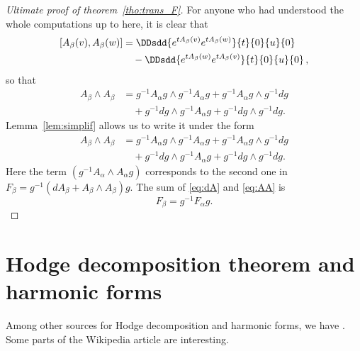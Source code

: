 \begin{proof}[Ultimate proof of theorem~\ref{tho:trans_F}]
	For anyone who had understood the whole computations up to here, it is clear that
	\begin{equation}
		\begin{split}
			[A_{\beta}(v),A_{\beta}(w)]&=\DDsdd{ e^{tA_{\beta}(v)}e^{tA_{\beta}(w)} }{t}{0}{u}{0}\\
			&\quad-\DDsdd{ e^{tA_{\beta}(w)}e^{tA_{\beta}(v)} }{t}{0}{u}{0}\,,
		\end{split}
	\end{equation}
	so that
	\begin{equation}
		\begin{split}
			A_{\beta}\wedge A_{\beta}&=g^{-1} A_{\alpha} g\wedge g^{-1} A_{\alpha} g
			+g^{-1} A_{\alpha} g\wedge g^{-1} dg\\
			&\quad+g^{-1} dg\wedge g^{-1} A_{\alpha} g
			+g^{-1} dg\wedge g^{-1} dg.
		\end{split}
	\end{equation}
	Lemma~\ref{lem:simplif} allows us to write it under the form
	\begin{equation}\label{eq:AA}
		\begin{split}
			A_{\beta}\wedge A_{\beta}&=g^{-1} A_{\alpha} g\wedge g^{-1} A_{\alpha} g
			+g^{-1} A_{\alpha} g\wedge g^{-1} dg\\
			&\quad+g^{-1} dg\wedge g^{-1} A_{\alpha} g
			+g^{-1} dg\wedge g^{-1} dg.
		\end{split}
	\end{equation}
	Here the term $(g^{-1} A_{\alpha}\wedge A_{\alpha} g)$ corresponds to the second one in $F_{\beta}=g^{-1}(dA_{\beta}+A_{\beta}\wedge A_{\beta})g$. The sum of \eqref{eq:dA} and \eqref{eq:AA} is
	\[
		F_{\beta}=g^{-1} F_{\alpha} g.
	\]
\end{proof}

\section{Hodge decomposition theorem and harmonic forms}

Among other sources for Hodge decomposition and harmonic forms, we have \cite{JohnsonHodge,CohoHarBound,UndergradDeRham}. Some parts of the Wikipedia article  are interesting.


